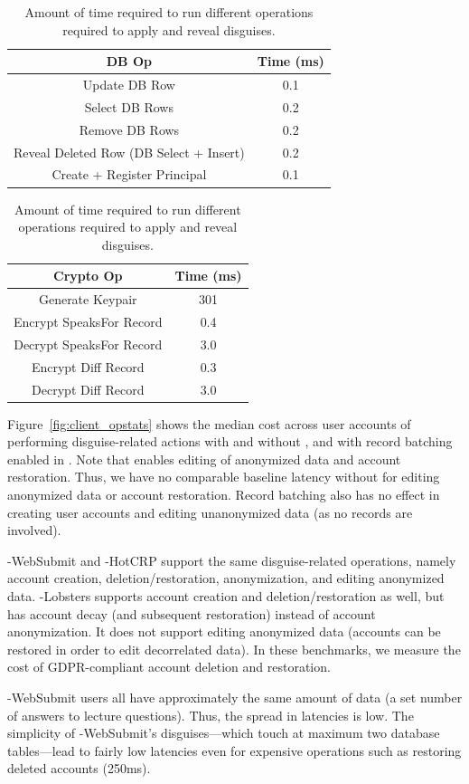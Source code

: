 \begin{table}[h!]
\begin{center}
\begin{tabular}{ c c }
\textbf{DB Op} & \textbf{Time (ms)}\\
\hline
Update DB Row & 0.1\\
Select DB Rows & 0.2\\
Remove DB Rows & 0.2\\
Reveal Deleted Row (DB Select + Insert) & 0.2 \\
Create + Register Principal & 0.1\\
\end{tabular}
\quad
\begin{tabular}{ c c }
\textbf{Crypto Op} & \textbf{Time (ms)}\\
\hline
Generate Keypair & 301\\
Encrypt SpeaksFor Record & 0.4\\
Decrypt SpeaksFor Record & 3.0\\
Encrypt Diff Record & 0.3\\
Decrypt Diff Record & 3.0\\
\end{tabular}
\end{center}
\caption{Amount of time required to run different operations required to apply and reveal disguises.}
\label{tab:opstats}
\end{table}

%
Figure~\ref{fig:client_opstats} shows the median cost across user accounts of performing disguise-related actions with and
without \sys, and with record batching enabled in \sys.
Note that \sys enables editing of anonymized data and account restoration. Thus, we have no
comparable baseline latency without \sys for editing anonymized data or account restoration.
Record batching also has no effect in creating user accounts and editing unanonymized data (as no
records are involved).

\sys-WebSubmit and \sys-HotCRP support the same disguise-related operations, namely
account creation, deletion/restoration, anonymization, and editing anonymized data.
\sys-Lobsters supports account creation and deletion/restoration as well, but has account decay (and
subsequent restoration) instead of account anonymization.  It does not support editing anonymized
data (accounts can be restored in order to edit decorrelated data). In these benchmarks, we measure
the cost of GDPR-compliant account deletion and restoration.

\sys-WebSubmit users all have approximately the same amount of data (a set number of answers to
lecture questions). Thus, the spread in latencies is low. The simplicity of \sys-WebSubmit's
disguises---which touch at maximum two database tables---lead to fairly low latencies even for
expensive operations such as restoring deleted accounts (250ms).

